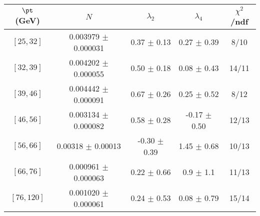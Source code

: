 \begin{tabular}{c||c|c|c|c}
$\pt$ (GeV) & $N$ & $\lambda_{2}$ & $\lambda_4$  & $\chi^2$/ndf  \\
\hline
$[25, 32]$ & 0.003979 $\pm$ 0.000031 & 0.37 $\pm$ 0.13 & 0.27 $\pm$ 0.39 & 8/10\\
$[32, 39]$ & 0.004202 $\pm$ 0.000055 & 0.50 $\pm$ 0.18 & 0.08 $\pm$ 0.43 & 14/11\\
$[39, 46]$ & 0.004442 $\pm$ 0.000091 & 0.67 $\pm$ 0.26 & 0.25 $\pm$ 0.52 & 8/12\\
$[46, 56]$ & 0.003134 $\pm$ 0.000082 & 0.58 $\pm$ 0.28 & -0.17 $\pm$ 0.50 & 12/13\\
$[56, 66]$ & 0.00318 $\pm$ 0.00013 & -0.30 $\pm$ 0.39 & 1.45 $\pm$ 0.68 & 10/13\\
$[66, 76]$ & 0.000961 $\pm$ 0.000063 & 0.22 $\pm$ 0.66 & 0.9 $\pm$ 1.1 & 11/13\\
$[76, 120]$ & 0.001020 $\pm$ 0.000061 & 0.24 $\pm$ 0.53 & 0.08 $\pm$ 0.79 & 15/14\\
\end{tabular}
